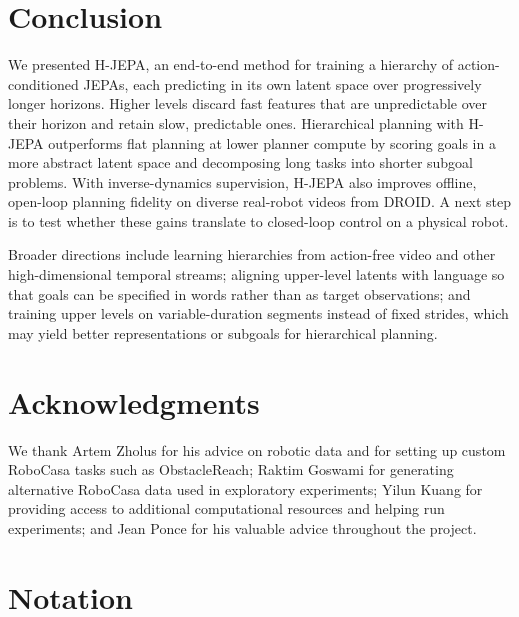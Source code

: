 \section{Conclusion}
\label{sec:conclusion}

We presented H-JEPA, an end-to-end method for training a hierarchy of
action-conditioned JEPAs, each predicting in its own latent space over
progressively longer horizons. Higher levels discard fast features that are
unpredictable over their horizon and retain slow, predictable ones. Hierarchical planning
with H-JEPA outperforms flat planning at lower planner compute by scoring goals in a more
abstract latent space and decomposing long tasks into shorter subgoal problems.
With inverse-dynamics supervision, H-JEPA also improves offline, open-loop planning
fidelity on diverse real-robot videos from DROID. A next step is to test whether
these gains translate to closed-loop control on a physical robot.

Broader directions include learning hierarchies from action-free video and other
high-dimensional temporal streams; aligning upper-level latents with language so
that goals can be specified in words rather than as target observations; and training
upper levels on variable-duration segments instead of fixed strides, which may yield better
representations or subgoals for hierarchical planning.

\section*{Acknowledgments}

We thank Artem Zholus for his advice on robotic data and for setting up custom
RoboCasa tasks such as ObstacleReach; Raktim Goswami for generating alternative
RoboCasa data used in exploratory experiments; Yilun Kuang for providing access to
additional computational resources and helping run experiments; and Jean Ponce
for his valuable advice throughout the project.

\newpage

\setlength{\bibsep}{0.4ex plus 0.2ex}

\clearpage
\beginappendix

\startcontents[appendix]
\clearpage

\section{Notation}
\label{app:notation}

